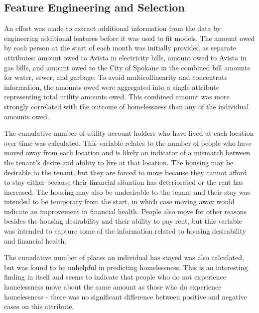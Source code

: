 \documentclass[10pt,letterpaper]{article}
\begin{document}
\subsection*{Feature Engineering and Selection}
An effort was made to extract additional information from the data by engineering additional features before it was used to fit models. The amount owed by each person at the start of each month was initially provided as separate attributes: amount owed to Avista in electricity bills, amount owed to Avista in gas bills, and amount owed to the City of Spokane in the combined bill amounts for water, sewer, and garbage. To avoid multicollinearity and concentrate information, the amounts owed were aggregated into a single attribute representing total utility amounts owed. This combined amount was more strongly correlated with the outcome of homelessness than any of the individual amounts owed.

The cumulative number of utility account holders who have lived at each location over time was calculated. This variable relates to the number of people who have moved away from each location and is likely an indicator of a mismatch between the tenant's desire and ability to live at that location. The housing may be desirable to the tenant, but they are forced to move because they cannot afford to stay either because their financial situation has deteriorated or the rent has increased. The housing may also be undesirable to the tenant and their stay was intended to be temporary from the start, in which case moving away would indicate an improvement in financial health. People also move for other reasons besides the housing desirability and their ability to pay rent, but this variable was intended to capture some of the information related to housing desirability and financial health.

The cumulative number of places an individual has stayed was also calculated, but was found to be unhelpful in predicting homelessness. This is an interesting finding in itself and seems to indicate that people who do not experience homelessness move about the same amount as those who do experience homelessness - there was no significant difference between positive and negative cases on this attribute.
\end{document}
